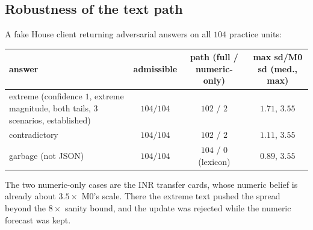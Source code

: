 \subsection{Robustness of the text path}

A fake House client returning adversarial answers on all $104$ practice units:
\begin{center}
{\small\begin{tabular}{p{}ccc}
\toprule
answer & admissible & path (full / numeric-only) & max sd/M0 sd (med., max)\\
\midrule
extreme (confidence $1$, extreme magnitude, both tails, $3$ scenarios, established) & $104/104$ & $102$ / $2$ & $1.71$, $3.55$\\
contradictory & $104/104$ & $102$ / $2$ & $1.11$, $3.55$\\
garbage (not JSON) & $104/104$ & $104$ / $0$ (lexicon) & $0.89$, $3.55$\\
\bottomrule
\end{tabular}}
\end{center}
The two numeric-only cases are the INR transfer cards, whose numeric belief is already about $3.5\times$ M0's scale. There the extreme text pushed
the spread beyond the $8\times$ sanity bound, and the update was rejected while the numeric forecast was kept.
